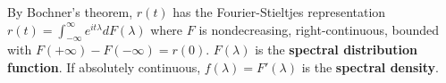 By Bochner's theorem, $r(t)$ has the Fourier-Stieltjes representation $r(t) = \int_{-\infty}^\infty e^{it\lambda} dF(\lambda)$ where $F$ is nondecreasing, right-continuous, bounded with $F(+\infty)-F(-\infty) = r(0)$. $F(\lambda)$ is the \textbf{spectral distribution function}. If absolutely continuous, $f(\lambda) = F'(\lambda)$ is the \textbf{spectral density}.
